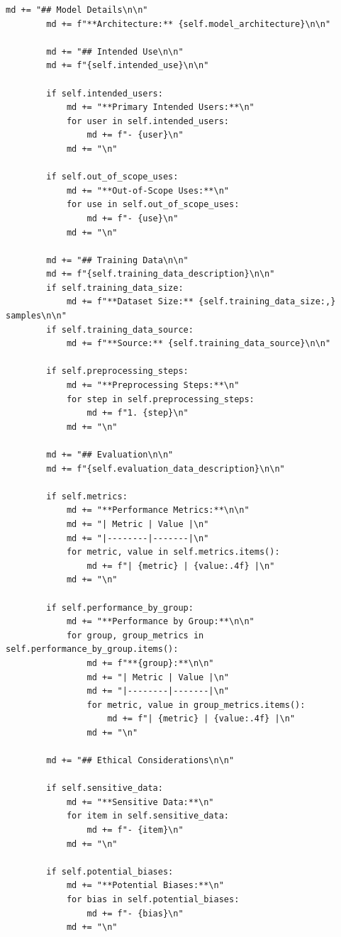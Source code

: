 \begin{lstlisting}[style=python, caption=Automated model card generation]
        md += "## Model Details\n\n"
        md += f"**Architecture:** {self.model_architecture}\n\n"

        md += "## Intended Use\n\n"
        md += f"{self.intended_use}\n\n"

        if self.intended_users:
            md += "**Primary Intended Users:**\n"
            for user in self.intended_users:
                md += f"- {user}\n"
            md += "\n"

        if self.out_of_scope_uses:
            md += "**Out-of-Scope Uses:**\n"
            for use in self.out_of_scope_uses:
                md += f"- {use}\n"
            md += "\n"

        md += "## Training Data\n\n"
        md += f"{self.training_data_description}\n\n"
        if self.training_data_size:
            md += f"**Dataset Size:** {self.training_data_size:,} samples\n\n"
        if self.training_data_source:
            md += f"**Source:** {self.training_data_source}\n\n"

        if self.preprocessing_steps:
            md += "**Preprocessing Steps:**\n"
            for step in self.preprocessing_steps:
                md += f"1. {step}\n"
            md += "\n"

        md += "## Evaluation\n\n"
        md += f"{self.evaluation_data_description}\n\n"

        if self.metrics:
            md += "**Performance Metrics:**\n\n"
            md += "| Metric | Value |\n"
            md += "|--------|-------|\n"
            for metric, value in self.metrics.items():
                md += f"| {metric} | {value:.4f} |\n"
            md += "\n"

        if self.performance_by_group:
            md += "**Performance by Group:**\n\n"
            for group, group_metrics in self.performance_by_group.items():
                md += f"**{group}:**\n\n"
                md += "| Metric | Value |\n"
                md += "|--------|-------|\n"
                for metric, value in group_metrics.items():
                    md += f"| {metric} | {value:.4f} |\n"
                md += "\n"

        md += "## Ethical Considerations\n\n"

        if self.sensitive_data:
            md += "**Sensitive Data:**\n"
            for item in self.sensitive_data:
                md += f"- {item}\n"
            md += "\n"

        if self.potential_biases:
            md += "**Potential Biases:**\n"
            for bias in self.potential_biases:
                md += f"- {bias}\n"
            md += "\n"


\end{lstlisting}
